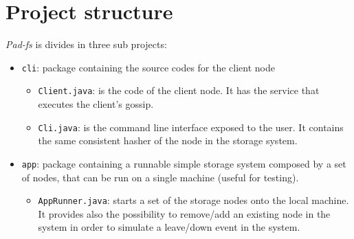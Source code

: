 \chapter{Project structure} \label{ch:ch2}
\textit{Pad-fs} is divides in three sub projects:
\begin{itemize}
\item \texttt{cli}: package containing the source codes for the client node
	\begin{itemize}
		\item \texttt{Client.java}: is the code of the client node. It has the service that executes the client's gossip.
		\item \texttt{Cli.java}: is the command line interface exposed to the user. It contains the same consistent hasher of the node in the storage system.
		
	\end{itemize}
\item \texttt{app}: package containing a runnable simple storage system composed by a set of nodes, that can be run on a single machine (useful for testing).
	\begin{itemize}
	 \item \texttt{AppRunner.java}: starts a set of the storage nodes onto the local machine. It provides also the possibility to remove/add an existing node in the system in order to simulate a leave/down event in the system.
	\end{itemize}


\end{itemize}
